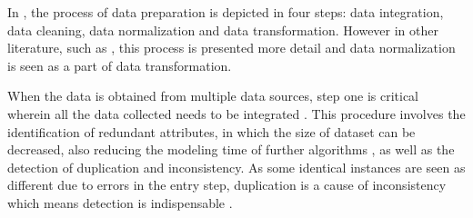 In \cite{77}, the process of data preparation is depicted in four steps: data integration, data cleaning, data normalization and data transformation. However in other literature, such as \cite{79}, this process is presented more detail and data normalization is seen as a part of data transformation. 

When the data is obtained from multiple data sources, step one is critical wherein all the data collected needs to be integrated \cite{77}. This procedure involves the identification of redundant attributes, in which the size of dataset can be decreased, also reducing the modeling time of further algorithms \cite{77}, as well as the detection of duplication and inconsistency. As some identical instances are seen as different due to errors in the entry step, duplication is a cause of inconsistency which means detection is indispensable \cite{80}.

